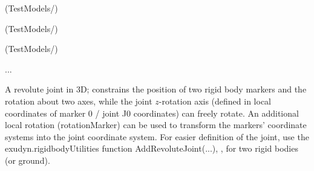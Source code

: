 \item {} (TestModels/)
\item {} (TestModels/)
\item {} (TestModels/)
\item  ...


\ei

%
\newpage


\label{sec:item:ObjectJointRevoluteZ}
A revolute joint in 3D; constrains the position of two rigid body markers and the rotation about two axes, while the joint $z$-rotation axis (defined in local coordinates of marker 0 / joint J0 coordinates) can freely rotate. An additional local rotation (rotationMarker) can be used to transform the markers' coordinate systems into the joint coordinate system. For easier definition of the joint, use the exudyn.rigidbodyUtilities function AddRevoluteJoint(...), , for two rigid bodies (or ground). 
\vspace{12pt}\\

